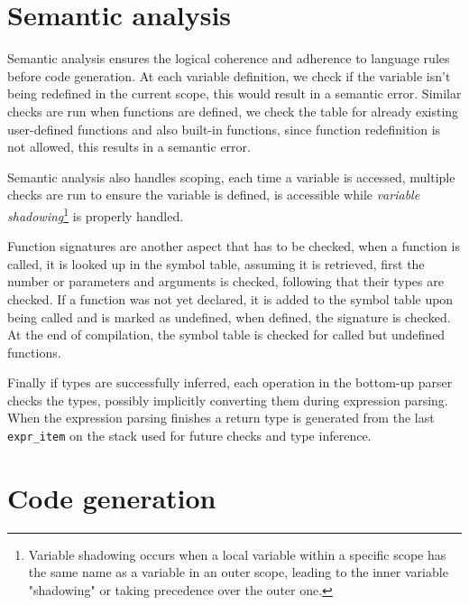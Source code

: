 \documentclass[11pt]{article}
\begin{document}
\section{Semantic analysis}
Semantic analysis ensures the logical coherence and adherence to language rules before code generation. At each variable definition, we check if the variable isn't being redefined in the current scope, this would result in a semantic error. Similar checks are run when functions are defined, we check the table for already existing user-defined functions and also built-in functions, since function redefinition is not allowed, this results in a semantic error. 

Semantic analysis also handles scoping, each time a variable is accessed, multiple checks are run to ensure the variable is defined, is accessible while \emph{variable shadowing}\footnote{Variable shadowing occurs when a local variable within a specific scope has the same name as a variable in an outer scope, leading to the inner variable "shadowing" or taking precedence over the outer one.} is properly handled.

Function signatures are another aspect that has to be checked, when a function is called, it is looked up in the symbol table, assuming it is retrieved, first the number or parameters and arguments is checked, following that their types are checked. If a function was not yet declared, it is added to the symbol table upon being called and is marked as undefined, when defined, the signature is checked. At the end of compilation, the symbol table is checked for called but undefined functions.

Finally if types are successfully inferred, each operation in the bottom-up parser checks the types, possibly implicitly converting them during expression parsing. When the expression parsing finishes a return type is generated from the last \texttt{expr\_item} on the stack used for future checks and type inference.

\section{Code generation}
\end{document}
